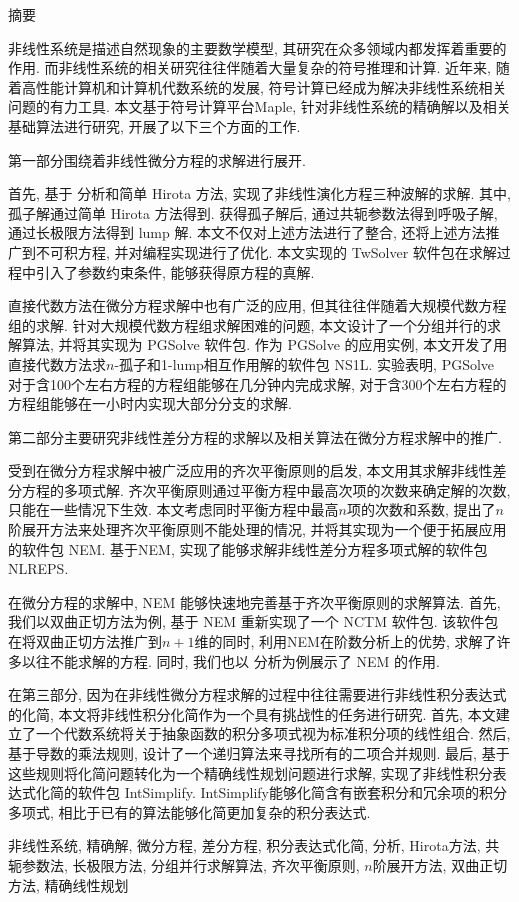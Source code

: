 {}
\centerline{\heiti 摘\quad 要}

\linespread{1.4} \bigskip

非线性系统是描述自然现象的主要数学模型, 其研究在众多领域内都发挥着重要的作用. 而非线性系统的相关研究往往伴随着大量复杂的符号推理和计算. 近年来, 随着高性能计算机和计算机代数系统的发展, 符号计算已经成为解决非线性系统相关问题的有力工具. 本文基于符号计算平台Maple, 针对非线性系统的精确解以及相关基础算法进行研究, 开展了以下三个方面的工作. 

第一部分围绕着非线性微分方程的求解进行展开. 

首先, 基于 \Painleve{} 分析和简单 Hirota 方法, 实现了非线性演化方程三种波解的求解. 其中, 孤子解通过简单 Hirota 方法得到. 获得孤子解后, 通过共轭参数法得到呼吸子解, 通过长极限方法得到 lump 解. 本文不仅对上述方法进行了整合, 还将上述方法推广到不可积方程, 并对编程实现进行了优化. 本文实现的 TwSolver 软件包在求解过程中引入了参数约束条件, 能够获得原方程的真解.  

直接代数方法在微分方程求解中也有广泛的应用, 但其往往伴随着大规模代数方程组的求解. 针对大规模代数方程组求解困难的问题, 本文设计了一个分组并行的求解算法, 并将其实现为 PGSolve 软件包. 作为 PGSolve 的应用实例, 本文开发了用直接代数方法求$n$-孤子和1-lump相互作用解的软件包 NS1L. 实验表明, PGSolve 对于含100个左右方程的方程组能够在几分钟内完成求解, 对于含300个左右方程的方程组能够在一小时内实现大部分分支的求解. 

第二部分主要研究非线性差分方程的求解以及相关算法在微分方程求解中的推广. 

受到在微分方程求解中被广泛应用的齐次平衡原则的启发, 本文用其求解非线性差分方程的多项式解. 齐次平衡原则通过平衡方程中最高次项的次数来确定解的次数, 只能在一些情况下生效. 本文考虑同时平衡方程中最高$n$项的次数和系数, 提出了$n$阶展开方法来处理齐次平衡原则不能处理的情况, 并将其实现为一个便于拓展应用的软件包 NEM. 基于NEM, 实现了能够求解非线性差分方程多项式解的软件包 NLREPS. 

在微分方程的求解中, NEM 能够快速地完善基于齐次平衡原则的求解算法. 首先, 我们以双曲正切方法为例, 基于 NEM 重新实现了一个 NCTM 软件包. 该软件包在将双曲正切方法推广到$n+1$维的同时, 利用NEM在阶数分析上的优势, 求解了许多以往不能求解的方程. 同时, 我们也以 \Painleve{} 分析为例展示了 NEM 的作用. 

在第三部分, 因为在非线性微分方程求解的过程中往往需要进行非线性积分表达式的化简, 本文将非线性积分化简作为一个具有挑战性的任务进行研究. 首先, 本文建立了一个代数系统将关于抽象函数的积分多项式视为标准积分项的线性组合. 然后, 基于导数的乘法规则, 设计了一个递归算法来寻找所有的二项合并规则. 最后, 基于这些规则将化简问题转化为一个精确线性规划问题进行求解, 实现了非线性积分表达式化简的软件包 IntSimplify.  IntSimplify能够化简含有嵌套积分和冗余项的积分多项式, 相比于已有的算法能够化简更加复杂的积分表达式. 

\bigskip

非线性系统, 精确解, 微分方程, 差分方程, 积分表达式化简, \Painleve{}分析, Hirota方法, 共轭参数法, 长极限方法, 分组并行求解算法, 齐次平衡原则, $n$阶展开方法, 双曲正切方法, 精确线性规划




